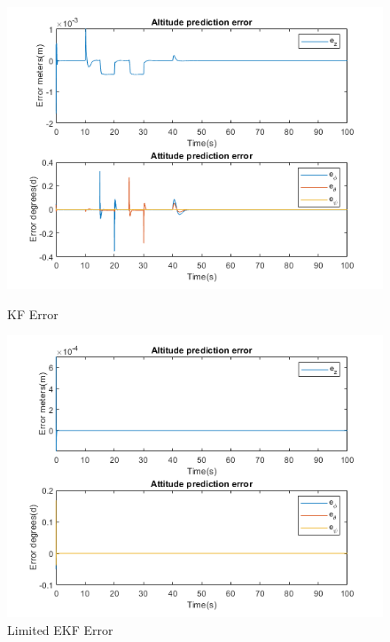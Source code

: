 \documentclass[12pt,a4paper,twoside]{report}
\begin{document}
				\begin{figure}[h!]
					\centering
					\begin{minipage}{0.5\textwidth}
						\centering
						\includegraphics[width=1\textwidth]{ModKFerror.png}	
						\caption{KF Error}
						\label{fig:modifiedkalmanfiltererror}
					\end{minipage}\hfill
					\begin{minipage}{0.5\textwidth}
						\centering
						\includegraphics[width=1\textwidth]{ModEKFerror.png}
						\caption{Limited EKF Error}
						\label{fig:limitedxtenderkalmanfiltererror}
					\end{minipage}
				\end{figure}
					
\end{document}

